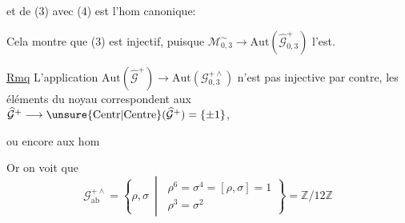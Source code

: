
et  de (3) avec (4) est l'hom
canonique:


Cela montre que (3) est injectif, puisque
$\mathcal{M}_{0,3}^{\sim}\longrightarrow\mathrm{Aut}(\widehat{\mathcal{G}}_{0,3}^{+})$
l'est. 

\uline{Rmq} L'application
$\mathrm{Aut}(\widehat{\mathcal{G}}^{+})\longrightarrow\mathrm{Aut}(\mathcal{G}_{0,3}^{+\wedge})$
n'est pas injective par contre,  les
éléments du noyau correspondent aux
$\widehat{\mathcal{G}}^{+}\longrightarrow\unsure{\mathrm{Centr}|\mathrm{Centre}}(\widehat{\mathcal{G}}^{+})=\{\pm1\}$,




ou encore aux hom 


Or on voit que
\[
\mathcal{G}_{\mathrm{ab}}^{+\wedge}
=\left\{\rho,\sigma\ \middle|\ \begin{gathered}
\rho^{6}=\sigma^{4}=[\rho,\sigma]=1\\
\rho^{3}=\sigma^{2}
\end{gathered}\right\}=\mathbb{Z}/12\mathbb{Z}
\]

